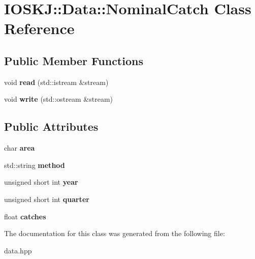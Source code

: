 \hypertarget{classIOSKJ_1_1Data_1_1NominalCatch}{\section{I\-O\-S\-K\-J\-:\-:Data\-:\-:Nominal\-Catch Class Reference}
\label{classIOSKJ_1_1Data_1_1NominalCatch}
}
\subsection*{Public Member Functions}
\begin{DoxyCompactItemize}
\item 
\hypertarget{classIOSKJ_1_1Data_1_1NominalCatch_a951b91a43b44fe8e0ade88245627a2ad}{void {\bfseries read} (std\-::istream \&stream)}\label{classIOSKJ_1_1Data_1_1NominalCatch_a951b91a43b44fe8e0ade88245627a2ad}

\item 
\hypertarget{classIOSKJ_1_1Data_1_1NominalCatch_ae32b6f662319fa27352d89e7f5918e5a}{void {\bfseries write} (std\-::ostream \&stream)}\label{classIOSKJ_1_1Data_1_1NominalCatch_ae32b6f662319fa27352d89e7f5918e5a}

\end{DoxyCompactItemize}
\subsection*{Public Attributes}
\begin{DoxyCompactItemize}
\item 
\hypertarget{classIOSKJ_1_1Data_1_1NominalCatch_a44e0f37b2fca0167eb89c4eea98785f3}{char {\bfseries area}}\label{classIOSKJ_1_1Data_1_1NominalCatch_a44e0f37b2fca0167eb89c4eea98785f3}

\item 
\hypertarget{classIOSKJ_1_1Data_1_1NominalCatch_a7c81dbf0ee1c934b6dad81477365a04e}{std\-::string {\bfseries method}}\label{classIOSKJ_1_1Data_1_1NominalCatch_a7c81dbf0ee1c934b6dad81477365a04e}

\item 
\hypertarget{classIOSKJ_1_1Data_1_1NominalCatch_a2a39b5de33deffc3bdfd20acf03be16b}{unsigned short int {\bfseries year}}\label{classIOSKJ_1_1Data_1_1NominalCatch_a2a39b5de33deffc3bdfd20acf03be16b}

\item 
\hypertarget{classIOSKJ_1_1Data_1_1NominalCatch_a480209d8d8f192a933a38aa872733131}{unsigned short int {\bfseries quarter}}\label{classIOSKJ_1_1Data_1_1NominalCatch_a480209d8d8f192a933a38aa872733131}

\item 
\hypertarget{classIOSKJ_1_1Data_1_1NominalCatch_afdcdb166bea101d81920b8508d785ebe}{float {\bfseries catches}}\label{classIOSKJ_1_1Data_1_1NominalCatch_afdcdb166bea101d81920b8508d785ebe}

\end{DoxyCompactItemize}


The documentation for this class was generated from the following file\-:\begin{DoxyCompactItemize}
\item 
data.\-hpp\end{DoxyCompactItemize}
